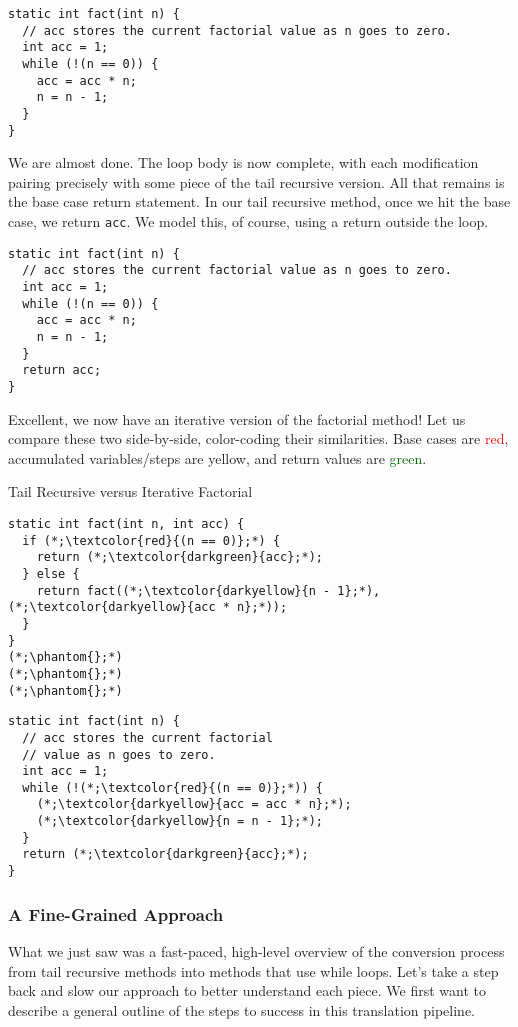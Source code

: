 \begin{lstlisting}[language=MyJava]
static int fact(int n) {
  // acc stores the current factorial value as n goes to zero.
  int acc = 1;
  while (!(n == 0)) {
    acc = acc * n;
    n = n - 1;
  }
}
\end{lstlisting}

We are almost done. The loop body is now complete, with each modification pairing precisely with some piece of the tail recursive version. All that remains is the base case return statement. In our tail recursive method, once we hit the base case, we return \texttt{acc}. We model this, of course, using a return outside the loop.

\begin{lstlisting}[language=MyJava]
static int fact(int n) {
  // acc stores the current factorial value as n goes to zero.
  int acc = 1;
  while (!(n == 0)) {
    acc = acc * n;
    n = n - 1;
  }
  return acc;
}
\end{lstlisting}

Excellent, we now have an iterative version of the factorial method! Let us compare these two side-by-side, color-coding their similarities. Base cases are \textcolor{red}{red}, accumulated variables/steps are \textcolor{darkyellow}{yellow}, and return values are \textcolor{darkgreen}{green}. 

\begin{clrr}[]{Tail Recursive versus Iterative Factorial}
\begin{lstlisting}[language=MyJavaNF]
static int fact(int n, int acc) {
  if (*;\textcolor{red}{(n == 0)};*) {
    return (*;\textcolor{darkgreen}{acc};*);
  } else {
    return fact((*;\textcolor{darkyellow}{n - 1};*), (*;\textcolor{darkyellow}{acc * n};*));
  }
}
(*;\phantom{};*)
(*;\phantom{};*)
(*;\phantom{};*)
\end{lstlisting}
\tcblower
\begin{lstlisting}[language=MyJavaNF]
static int fact(int n) {
  // acc stores the current factorial
  // value as n goes to zero.
  int acc = 1;
  while (!(*;\textcolor{red}{(n == 0)};*)) {
    (*;\textcolor{darkyellow}{acc = acc * n};*);
    (*;\textcolor{darkyellow}{n = n - 1};*);
  }
  return (*;\textcolor{darkgreen}{acc};*);
}
\end{lstlisting}
\end{clrr}

\subsubsection*{A Fine-Grained Approach}
What we just saw was a fast-paced, high-level overview of the conversion process from tail recursive methods into methods that use while loops. Let’s take a step back and slow our approach to better understand each piece. We first want to describe a general outline of the steps to success in this translation pipeline. 

